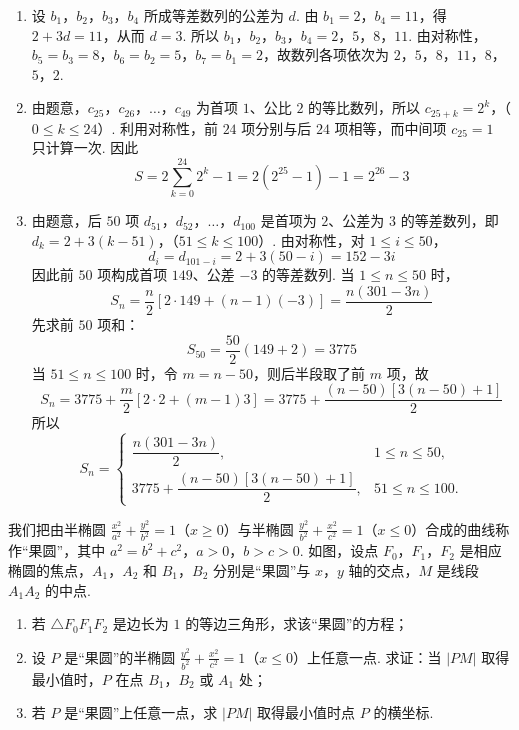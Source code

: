 \begin{solution}
\begin{enumerate}
\item 设 \(b_1\)，\(b_2\)，\(b_3\)，\(b_4\) 所成等差数列的公差为 \(d\). 由 \(b_1=2\)，\(b_4=11\)，得 \(2+3d=11\)，从而 \(d=3\).
所以 \(b_1\)，\(b_2\)，\(b_3\)，\(b_4=2\)，\(5\)，\(8\)，\(11\). 由对称性，\(b_5=b_3=8\)，\(b_6=b_2=5\)，\(b_7=b_1=2\)，故数列各项依次为
\(2\)，\(5\)，\(8\)，\(11\)，\(8\)，\(5\)，\(2\).

\item 由题意，\(c_{25}\)，\(c_{26}\)，\(\ldots\)，\(c_{49}\) 为首项 \(1\)、公比 \(2\) 的等比数列，所以
\(c_{25+k}=2^k\)，（\(0\leqslant k\leqslant24\)）.
利用对称性，前 \(24\) 项分别与后 \(24\) 项相等，而中间项 \(c_{25}=1\) 只计算一次. 因此
\[
S=2\sum_{k=0}^{24}2^k-1=2\left(2^{25}-1\right)-1=2^{26}-3
\]

\item 由题意，后 \(50\) 项 \(d_{51}\)，\(d_{52}\)，\(\ldots\)，\(d_{100}\) 是首项为 \(2\)、公差为 \(3\) 的等差数列，即
\(d_k=2+3(k-51)\)，（\(51\leqslant k\leqslant100\)）.
由对称性，对 \(1\leqslant i\leqslant50\)，
\[
d_i=d_{101-i}=2+3(50-i)=152-3i
\]
因此前 \(50\) 项构成首项 \(149\)、公差 \(-3\) 的等差数列. 当 \(1\leqslant n\leqslant50\) 时，
\[
S_n=\frac{n}{2}\left[2\cdot149+(n-1)(-3)\right]=\frac{n(301-3n)}{2}
\]
先求前 \(50\) 项和：
\[
S_{50}=\frac{50}{2}(149+2)=3775
\]
当 \(51\leqslant n\leqslant100\) 时，令 \(m=n-50\)，则后半段取了前 \(m\) 项，故
\[
S_n=3775+\frac{m}{2}\left[2\cdot2+(m-1)3\right]
=3775+\frac{(n-50)\left[3(n-50)+1\right]}{2}
\]
所以
\[
S_n=\begin{cases}
\dfrac{n(301-3n)}{2},&1\leqslant n\leqslant50,\\[6pt]
3775+\dfrac{(n-50)\left[3(n-50)+1\right]}{2},&51\leqslant n\leqslant100.
\end{cases}
\]
\end{enumerate}
\end{solution}

\begin{problem}
我们把由半椭圆 \(\frac{x^2}{a^2} + \frac{y^2}{b^2} = 1\)（\(x \geqslant 0\)）与半椭圆 \(\frac{y^2}{b^2} + \frac{x^2}{c^2} = 1\)（\(x \leqslant 0\)）合成的曲线称作“果圆”，其中 \(a^2 = b^2 + c^2\)，\(a > 0\)，\(b > c > 0\). 如图，设点 \(F_0\)，\(F_1\)，\(F_2\) 是相应椭圆的焦点，\(A_1\)，\(A_2\) 和 \(B_1\)，\(B_2\) 分别是“果圆”与 \(x\)，\(y\) 轴的交点，\(M\) 是线段 \(A_1A_2\) 的中点.

\begin{enumerate}
\item 若 \(\triangle F_0F_1F_2\) 是边长为 \(1\) 的等边三角形，求该“果圆”的方程；
\item 设 \(P\) 是“果圆”的半椭圆 \(\frac{y^2}{b^2} + \frac{x^2}{c^2} = 1\)（\(x \leqslant 0\)）上任意一点. 求证：当 \(|PM|\) 取得最小值时，\(P\) 在点 \(B_1\)，\(B_2\) 或 \(A_1\) 处；
\item 若 \(P\) 是“果圆”上任意一点，求 \(|PM|\) 取得最小值时点 \(P\) 的横坐标.
\end{enumerate}

\end{problem}

